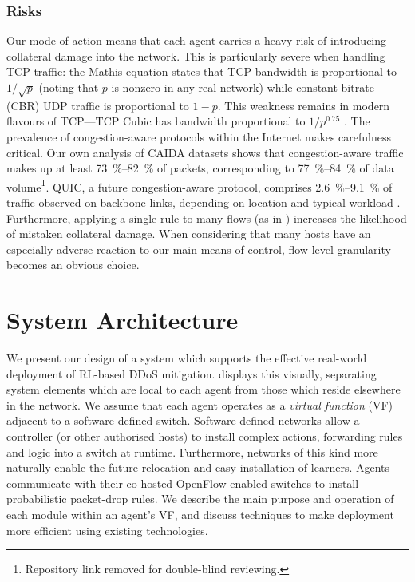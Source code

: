 \documentclass[10pt, times, conference, letterpaper]{IEEEtran}
\begin{document}
\subsubsection{Risks}
Our mode of action means that each agent carries a heavy risk of introducing collateral damage into the network.
This is particularly severe when handling TCP traffic: the Mathis equation \cite{DBLP:journals/ccr/MathisSMO97} states that TCP bandwidth is proportional to $1/\sqrt{p}$ (noting that $p$ is nonzero in any real network) while constant bitrate (CBR) UDP traffic is proportional to $1 - p$.
This weakness remains in modern flavours of TCP---TCP Cubic has bandwidth proportional to $1/p^{0.75}$ \cite{rfc8312}.
The prevalence of congestion-aware protocols within the Internet makes carefulness critical.
Our own analysis of CAIDA datasets \cite{caida-2018-passive} shows that congestion-aware traffic makes up at least \SIrange{73}{82}{\percent} of packets, corresponding to \SIrange{77}{84}{\percent} of data volume\footnote{Repository link removed for double-blind reviewing.}.
QUIC, a future congestion-aware protocol, comprises \SIrange{2.6}{9.1}{\percent} of traffic observed on backbone links, depending on location and typical workload \cite{DBLP:conf/pam/RuthPDH18}.
Furthermore, applying a single rule to many flows (as in \textcite{DBLP:journals/eaai/MalialisK15}) increases the likelihood of mistaken collateral damage.
When considering that many hosts have an especially adverse reaction to our main means of control, flow-level granularity becomes an obvious choice.

\section{System Architecture}\label{sec:system-architecture}

We present our design of a system which supports the effective real-world deployment of RL-based DDoS mitigation.
 displays this visually, separating system elements which are local to each agent from those which reside elsewhere in the network.
We assume that each agent operates as a \emph{virtual function} (VF) adjacent to a software-defined switch.
Software-defined networks allow a controller (or other authorised hosts) to install complex actions, forwarding rules and logic into a switch at runtime.
Furthermore, networks of this kind more naturally enable the future relocation and easy installation of learners.
Agents communicate with their co-hosted OpenFlow-enabled switches to install probabilistic packet-drop rules.
We describe the main purpose and operation of each module within an agent's VF, and discuss techniques to make deployment more efficient using existing technologies.
\end{document}
